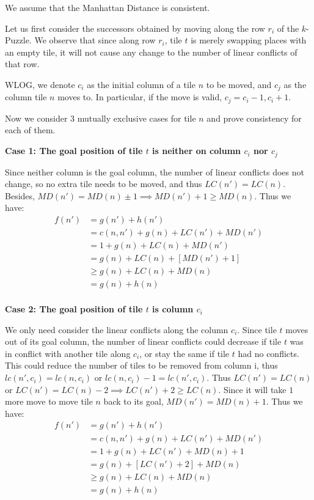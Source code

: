 \documentclass{llncs}
\begin{document}
We assume that the Manhattan Distance is consistent.

Let us first consider the successors obtained by moving along the row $r_i$ of the $k$-Puzzle. We observe that since along row $r_i$, tile $t$ is merely swapping places with an empty tile, it will not cause any change to the number of linear conflicts of that row.

WLOG, we denote $c_i$ as the initial column of a tile $n$ to be moved, and $c_j$ as the column tile $n$ moves to. In particular, if the move is valid, $c_j = c_i - 1, c_i + 1$.

Now we consider 3 mutually exclusive cases for tile $n$ and prove consistency for each of them.

\textbf{Case 1: The goal position of tile $t$ is neither on column $c_i$ nor $c_j$}

Since neither column is the goal column, the number of linear conflicts does not change, so no extra tile needs to be moved, and thus $LC(n') = LC(n)$. Besides, $MD(n') = MD(n) \pm 1 \implies MD(n') + 1 \geq MD(n)$. Thus we have:
\begin{align}
    f(n') \nonumber
    	&= g(n') + h(n') \\\nonumber
        &= c(n,n') + g(n) + LC(n') + MD(n') \\\nonumber
        &= 1 + g(n) + LC(n) + MD(n') \\\nonumber
        &= g(n) + LC(n) + [MD(n') + 1] \\\nonumber
        &\geq g(n) + LC(n) + MD(n) \\\nonumber
        &= g(n) + h(n) \\\nonumber
\end{align}

\textbf{Case 2: The goal position of tile $t$ is column $c_i$}

We only need consider the linear conflicts along the column $c_i$. Since tile $t$ moves out of its goal column, the number of linear conflicts could decrease if tile $t$ was in conflict with another tile along $c_i$, or stay the same if tile $t$ had no conflicts. This could reduce the number of tiles to be removed from column i, thus $lc(n',c_i) =lc(n,c_i)$ or $lc(n,c_i)-1 = lc(n',c_i)$. Thus $LC(n') = LC(n)$ or $LC(n') = LC(n) - 2 \implies LC(n') + 2 \geq LC(n)$. Since it will take $1$ more move to move tile $n$ back to its goal, $MD(n') = MD(n) + 1$. Thus we have:
\begin{align}
    f(n') \nonumber
    	&= g(n') + h(n') \\\nonumber
        &= c(n,n') + g(n) + LC(n') + MD(n') \\\nonumber
        &= 1 + g(n) + LC(n') + MD(n) + 1 \\\nonumber
        &= g(n) + [LC(n') + 2] + MD(n) \\\nonumber
        &\geq g(n) + LC(n) + MD(n) \\\nonumber
        &= g(n) + h(n) \\\nonumber
\end{align}
\end{document}
